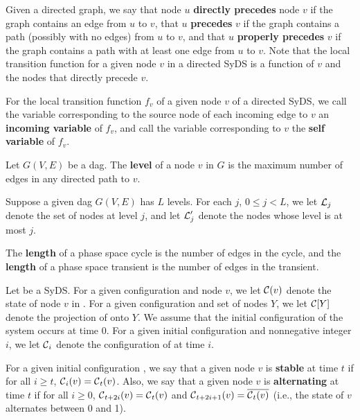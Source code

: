 Given a directed graph, we say that node $u$ {\bf directly precedes} node $v$ 
if the graph contains an edge from $u$ to $v$,
 that $u$ {\bf precedes} $v$ if the graph contains a path (possibly with no edges) from $u$ to $v$,
and that $u$ {\bf properly precedes} $v$
 if the graph contains a path with at least one edge  from $u$ to $v$.
Note that the local transition function for a given node $v$  in a directed SyDS is a function of $v$
 and the nodes that directly precede $v$.

\begin{definition}\label{def:variable_typesl}
For the local transition function $f_v$ of a given node $v$ of a directed  SyDS,
we call the variable corresponding to the source node 
of each incoming edge to $v$ an {\bf incoming variable} of $f_v$,
and call the variable corresponding to $v$ the  {\bf self variable} of $f_v$.
\end{definition}

\begin{definition}\label{def:dag_level}
Let $G(V,E)$ be a dag.
The \textbf{level} of a node $v$  in $G$ is the maximum number
of edges in any directed path to $v$.
\end{definition}

Suppose a given dag $G(V,E)$ has $L$ levels. 
For each $j$, $0 \leq j < L$, we let $\mbox{$\mathcal{L}$}_j$ denote the set of nodes at level $j$,
and let $\mbox{$\mathcal{L}$}_j'$ denote the nodes whose level is at most $j$.

The {\bf length} of a phase space cycle is the number of edges in the cycle,
and the {\bf length} of a phase space transient is the number of edges in the transient.

Let \cals{} be a SyDS.
For a given configuration \calc{} and node $v$,
we let $\mbox{$\mathcal{C}$}(v)$ denote the state of node $v$ in \calc{}.
For a given configuration \calc{} and set of nodes $Y$,
we let $\mbox{$\mathcal{C}$}[Y]$ denote the projection of \calc{} onto $Y$.
We assume that the initial configuration of the system 
occurs at time 0.
For a given initial configuration \calc{} and nonnegative integer $i$,
we let $\mbox{$\mathcal{C}$}_i$ denote the configuration of \cals{} at time $i$.

For a given initial configuration \calc{},
we  say that a given node $v$ is \textbf{stable} at time $t$ if
for all $i \geq t$, $\mbox{$\mathcal{C}$}_i(v)= \mbox{$\mathcal{C}$}_t(v)$.
Also, we say that a given node $v$ is \textbf{alternating} at time $t$ if
for all $i \geq 0$, 
$\mbox{$\mathcal{C}$}_{t+2i}(v) =  \mbox{$\mathcal{C}$}_t(v)$ 
and $\mbox{$\mathcal{C}$}_{t+2i+1}(v) = \overline{ \mbox{$\mathcal{C}$}_t(v)}$ 
(i.e., the state of $v$ alternates between 0 and 1).  

